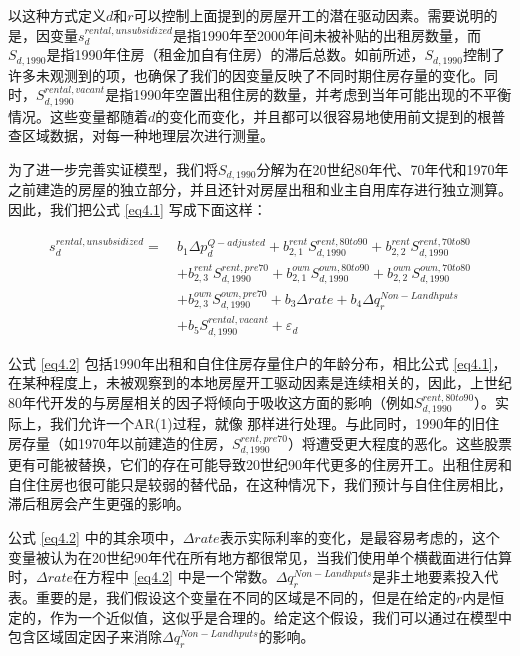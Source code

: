 \documentclass[lang=cn,11pt,a4paper]{paper}
\begin{document}
以这种方式定义$d$和$r$可以控制上面提到的房屋开工的潜在驱动因素。需要说明的是，因变量$s_{d}^{rental,unsubsidized}$是指1990年至2000年间未被补贴的出租房数量，而$S_{d,1990}$是指1990年住房（租金加自有住房）的滞后总数。如前所述，$S_{d, 1990}$控制了许多未观测到的项，也确保了我们的因变量反映了不同时期住房存量的变化。同时，$S_{d, 1990}^{rental, vacant}$是指1990年空置出租住房的数量，并考虑到当年可能出现的不平衡情况。这些变量都随着$d$的变化而变化，并且都可以很容易地使用前文提到的根普查区域数据，对每一种地理层次进行测量。

为了进一步完善实证模型，我们将$S_{d,1990}$分解为在20世纪80年代、70年代和1970年之前建造的房屋的独立部分，并且还针对房屋出租和业主自用库存进行独立测算。因此，我们把公式 \eqref{eq4.1} 写成下面这样：

\begin{equation}\label{eq4.2}
\begin{aligned}
  s_{d}^{rental,unsubsidized}=\ & b_{1} \Delta p_{d}^{Q-adjusted}+b_{2,1}^{rent} S_{d, 1990}^{rent, 80 t o 90}+b_{2,2}^{rent} S_{d, 1990}^{rent, 70 to 80} \\
  &+b_{2,3}^{rent} S_{d, 1990}^{rent, pre 70}+b_{2,1}^{own} S_{d, 1990}^{own, 80 to 90}+b_{2,2}^{own} S_{d, 1990}^{own, 70 to 80} \\
  &+b_{2,3}^{own} S_{d, 1990}^{own, pre 70}+b_{3} \Delta rate+b_{4} \Delta q_{r}^{Non-Landhputs} \\
  &+b_{5} S_{d, 1990}^{rental,vacant}+\varepsilon_{d}
  \end{aligned}
\end{equation}

公式 \eqref{eq4.2} 包括1990年出租和自住住房存量住户的年龄分布，相比公式 \eqref{eq4.1}，在某种程度上，未被观察到的本地房屋开工驱动因素是连续相关的，因此，上世纪80年代开发的与房屋相关的因子将倾向于吸收这方面的影响（例如$S_{d, 1990}^{rent, 80 to 90}$）。实际上，我们允许一个AR(1)过程，就像 \cite{Mayer200085} 那样进行处理。与此同时，1990年的旧住房存量（如1970年以前建造的住房，$S_{d, 1990}^{rent, pre70}$）将遭受更大程度的恶化。这些股票更有可能被替换，它们的存在可能导致20世纪90年代更多的住房开工。出租住房和自住住房也很可能只是较弱的替代品，在这种情况下，我们预计与自住住房相比，滞后租房会产生更强的影响。

公式 \eqref{eq4.2} 中的其余项中，$\Delta rate$表示实际利率的变化，是最容易考虑的，这个变量被认为在20世纪90年代在所有地方都很常见，当我们使用单个横截面进行估算时，$\Delta rate$在方程中 \eqref{eq4.2} 中是一个常数。$\Delta q_{r}^{Non-Landhputs}$是非土地要素投入代表。重要的是，我们假设这个变量在不同的区域是不同的，但是在给定的$r$内是恒定的，作为一个近似值，这似乎是合理的。给定这个假设，我们可以通过在模型中包含区域固定因子来消除$\Delta q_{r}^{Non-Landhputs}$的影响。
\end{document}
